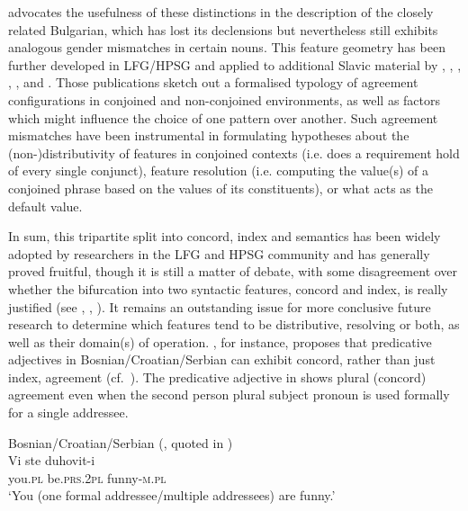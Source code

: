 \documentclass[output=paper,hidelinks]{langscibook}
\begin{document}
\citet{Hristov2012,Hristov:LFG13} advocates the usefulness of these distinctions in the description of the closely related Bulgarian, which has lost its declensions but nevertheless still exhibits analogous gender mismatches in certain nouns. This feature geometry has been further developed in LFG/HPSG and applied to additional Slavic material by \citet{DalrympleKaplan2000}, \citet{PrzepiorkowskiKupscMarciniakMykowiecka2002}, \citet{kingdalrymple04}, \citet{DH:Agr}, \citet{Hristov2012,Hristov:LFG13}, and \citet{belyaev-etal2015}. Those publications sketch out a formalised typology of agreement configurations in conjoined and non-conjoined environments, as well as factors which might influence the choice of one pattern over another. Such agreement mismatches have been instrumental in formulating hypotheses about the (non-)distributivity of features in conjoined contexts (i.e. does a requirement hold of every single conjunct), feature resolution (i.e. computing the value(s) of a conjoined phrase based on the values of its constituents), or what acts as the default value.

In sum, this tripartite split into concord, index and semantics has been widely adopted by researchers in the LFG and HPSG community and has generally proved fruitful, though it is still a matter of debate, with some disagreement over whether the bifurcation into two syntactic features, concord and index, is really justified (see \citealt{AlsinaArsenijevic2012a,Alsina:Two,Alsina:Third}, \citealt{Wechsler:Wrong}, \citealt{Hristov:LFG13}). It remains an outstanding issue for more conclusive future research to determine which features tend to be distributive, resolving or both, as well as their domain(s) of operation. \citet{Wechsler:Mixed}, for instance, proposes that predicative adjectives in Bosnian/Croatian/Serbian can exhibit concord, rather than just index, agreement (cf.\ ). The predicative adjective in  shows plural (concord) agreement even when the second person plural subject pronoun is used formally for a single addressee.

\ea Bosnian/Croatian/Serbian (\citealt{Wechsler:Mixed}, quoted in \citealt[79]{DLM:LFG})%
    \label{ex:Slavic:7}\\
    \gll Vi   ste     duhovit-i\\
        you.\textsc{pl} be.\textsc{prs.2pl}   funny-\textsc{m.pl}\\
    \glt`You (one formal addressee/multiple addressees) are funny.' 
    \z
\end{document}
